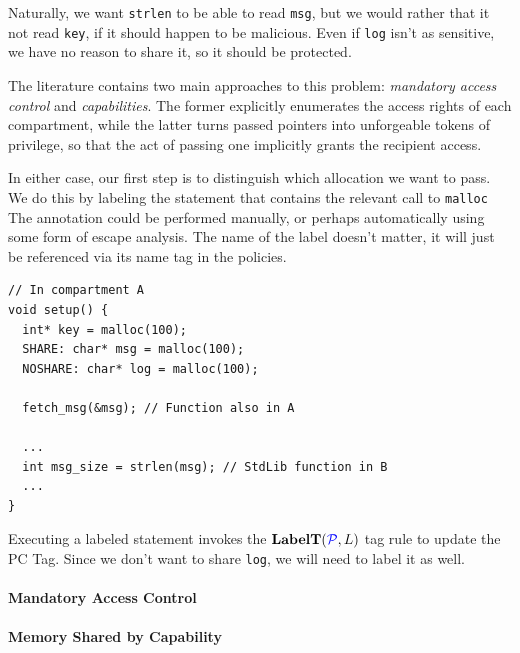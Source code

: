 \documentclass[acmsmall,review,anonymous]{acmart}\settopmatter{printfolios=true,printccs=false,printacmref=false}
\begin{document}
Naturally, we want {\tt strlen} to be able to read {\tt msg}, but we would
rather that it not read {\tt key}, if it should happen to be malicious.
Even if {\tt log} isn't as sensitive, we have no reason to share it, so
it should be protected.

The literature contains two main approaches to this problem:
{\em mandatory access control} and {\em capabilities}. The former explicitly
enumerates the access rights of each compartment, while the latter turns passed
pointers into unforgeable tokens of privilege, so that the act of passing one
implicitly grants the recipient access.

In either case, our first step is to distinguish which allocation we want to pass.
We do this by labeling the statement that contains the relevant call to {\tt malloc}
The annotation could be performed manually, or perhaps automatically using some form
of escape analysis. The name of the label doesn't matter, it will just be referenced
via its name tag in the policies.

\begin{verbatim}
// In compartment A
void setup() {
  int* key = malloc(100);
  SHARE: char* msg = malloc(100);
  NOSHARE: char* log = malloc(100);

  fetch_msg(&msg); // Function also in A

  ...
  int msg_size = strlen(msg); // StdLib function in B
  ...
}
\end{verbatim}

Executing a labeled statement invokes the \(\mathbf{LabelT}(\mathcal{\color{blue} P}, L)\) tag rule to update the PC Tag.
Since we don't want to share {\tt log}, we will need to label it as well.

\paragraph{Mandatory Access Control}

\paragraph{Memory Shared by Capability}

%
\end{document}
